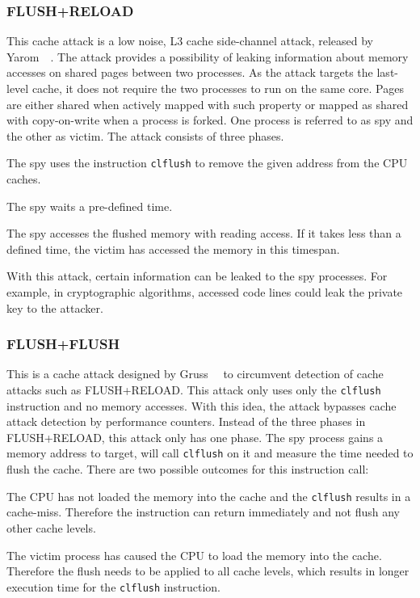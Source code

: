 \subsubsection{FLUSH+RELOAD}

This cache attack is a low noise, L3 cache side-channel attack, released
by Yarom~\etal~\cite{flushreload}. The attack provides a possibility of leaking
information about memory accesses on shared pages between two processes. As the
attack targets the last-level cache, it does not require the two processes to
run on the same core. Pages are either shared when actively mapped with such
property or mapped as shared with copy-on-write when a process is forked. One
process is referred to as spy and the other as victim. The attack consists of
three phases.

\begin{enumerate}
\begin{samepage}
\item The spy uses the instruction \texttt{clflush} to remove the given address
from the CPU caches.
\item The spy waits a pre-defined time.
\item The spy accesses the flushed memory with reading access. If it takes less
than a defined time, the victim has accessed the memory in this timespan.
\end{samepage}
\end{enumerate}

With this attack, certain information can be leaked to the spy processes. For
example, in cryptographic algorithms, accessed code lines could leak the private
key to the attacker.

\subsubsection{FLUSH+FLUSH}

This is a cache attack designed by Gruss~\etal~\cite{flushflush} to circumvent
detection of cache attacks such as FLUSH+RELOAD. This attack only uses only the
\texttt{clflush} instruction and no memory accesses. With this idea, the attack
bypasses cache attack detection by performance counters. Instead of the three
phases in FLUSH+RELOAD, this attack only has one phase. The spy process gains a
memory address to target, will call \texttt{clflush} on it and measure the time
needed to flush the cache. There are two possible outcomes for this instruction
call:

\begin{itemize}
\begin{samepage}
\item The CPU has not loaded the memory into the cache and the \texttt{clflush}
results in a cache-miss. Therefore the instruction can return immediately and
not flush any other cache levels.
\item The victim process has caused the CPU to load the memory into the cache.
Therefore the flush needs to be applied to all cache levels, which results in
longer execution time for the \texttt{clflush} instruction.
\end{samepage}
\end{itemize}

